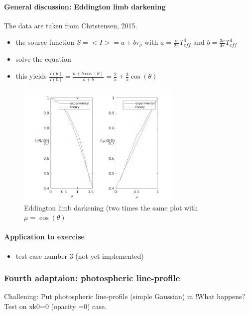 \documentclass[../main/main.tex]{subfiles}
\begin{document}
\paragraph{General discussion: Eddington limb darkening}
The data are taken from Christensen, 2015.
\begin{itemize}
\item the source function $S= <I> = a + b\tau_{\nu}$ with $a= \frac{\sigma}{2 \pi}T_{eff}^4$ and $b = \frac{3 \sigma}{4 \pi}T_{eff}^4$
\item solve the equation
\item this yields $\frac{I(\theta)}{I(0)} = \frac{a+b\cos(\theta)}{a+b} = \frac{2}{5} + \frac{3}{5}\cos(\theta)$
\end{itemize}
\begin{figure}[!htp]
\centering
\includegraphics[width=0.7\textwidth]{../../introductory_exercises/P_Cygni_profile_UV_resonance/Eddington_limb_darkening.png}
\caption{Eddington limb darkening (two times the same plot with $\mu =  \cos(\theta)$ }
\end{figure}

\noindent{}

\paragraph{Application to exercise}
\begin{itemize}
\item test case number 3 (not yet implemented)
\end{itemize}

\newpage
\subsubsection{Fourth adaptaion: photospheric line-profile}
Challening: Put photospheric line-profile (simple Gaussian) in
!What happens? Test on xk0=0 (opacity =0) case.
\end{document}
